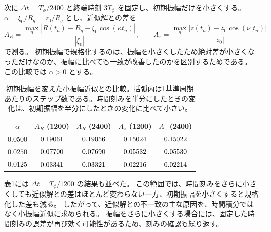 次に $\Delta t=T_\phi/2400$ と終端時刻 $3T_\phi$ を固定し、初期振幅だけを小さくする。
$\alpha=\xi_0/R_g=z_0/R_g$ とし、近似解との差を
\begin{equation}
 A_R=\frac{\max_n|R(t_n)-R_g-\xi_0\cos(\kappa t_n)|}{|\xi_0|},\qquad
 A_z=\frac{\max_n|z(t_n)-z_0\cos(\nu_z t_n)|}{|z_0|}
\label{eq:appC-amplitude-differences}
\end{equation}
で測る。
初期振幅で規格化するのは、振幅を小さくしたため絶対差が小さくなっただけなのか、振幅に比べても一致が改善したのかを区別するためである。
この比較では $\alpha>0$ とする。

\begin{table}[!htbp]
\centering
\caption{初期振幅を変えた小振幅近似との比較。括弧内は1基準周期あたりのステップ数である。時間刻みを半分にしたときの変化は、初期振幅を半分にしたときの変化に比べて小さい。}
\label{tab:appC-amplitude-comparison}
\begin{tabular}{ccccc}
\toprule
$\alpha$ & $A_R$ (1200) & $A_R$ (2400) & $A_z$ (1200) & $A_z$ (2400) \\
\midrule
$0.0500$ & $0.19061$ & $0.19056$ & $0.15024$ & $0.15022$ \\
$0.0250$ & $0.07700$ & $0.07690$ & $0.05532$ & $0.05530$ \\
$0.0125$ & $0.03341$ & $0.03321$ & $0.02216$ & $0.02214$ \\
\bottomrule
\end{tabular}
\end{table}

表\ref{tab:appC-amplitude-comparison}には $\Delta t=T_\phi/1200$ の結果も並べた。
この範囲では、時間刻みをさらに小さくしても近似解との差はほとんど変わらない一方、初期振幅を小さくすると規格化した差も減る。
したがって、近似解との不一致の主な原因を、時間積分ではなく小振幅近似に求められる。
振幅をさらに小さくする場合には、固定した時間刻みの誤差が再び効く可能性があるため、刻みの確認も繰り返す。

